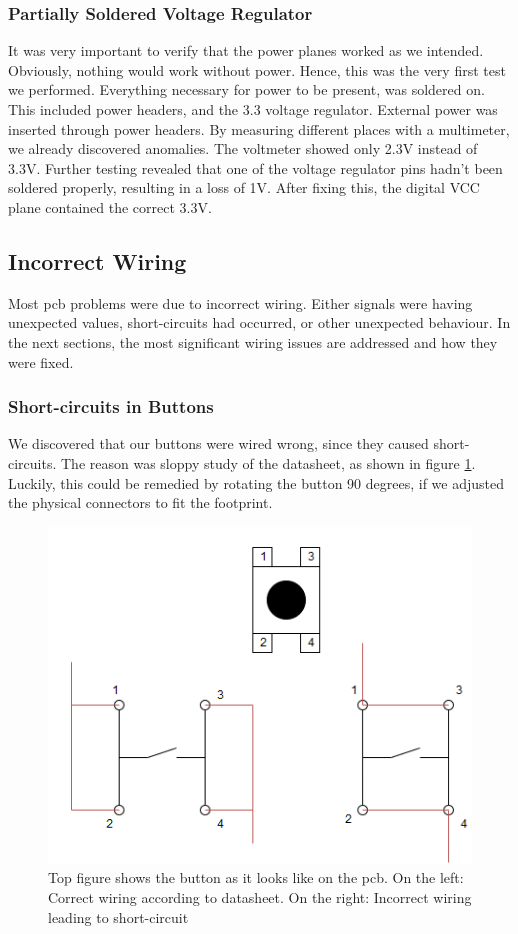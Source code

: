 \subsubsection{Partially Soldered Voltage Regulator} 
It was very important to verify that the power planes worked as we intended. Obviously, nothing would work without power. Hence, this was the very first test we performed.
\newline
Everything necessary for power to be present, was soldered on. This included power headers, and the 3.3 voltage regulator. External power was inserted through power headers. By measuring different places with a multimeter, we already discovered anomalies. The voltmeter showed only 2.3V instead of 3.3V. Further testing revealed that one of the voltage regulator pins hadn't been soldered properly, resulting in a loss of 1V. After fixing this, the digital VCC plane contained the correct 3.3V.

\subsection{Incorrect Wiring}
Most \gls{pcb} problems were due to incorrect wiring. Either signals were having unexpected values, short-circuits had occurred, or other unexpected behaviour. In the next sections, the most significant wiring issues are addressed and how they were fixed.

\subsubsection{Short-circuits in Buttons}
We discovered that our buttons were wired wrong, since they caused short-circuits. The reason was sloppy study of the datasheet, as shown in figure \ref{fig:Button Issue}. Luckily, this could be remedied by rotating the button 90 degrees, if we adjusted the physical connectors to fit the footprint.

\begin{figure}[h!]
\centering
\includegraphics[scale=0.5]{images/Button_Issue.png}
\caption{Top figure shows the button as it looks like on the \gls{pcb}. On the left: Correct wiring according to datasheet. On the right: Incorrect wiring leading to short-circuit}
\label{fig:Button Issue}
\end{figure}

